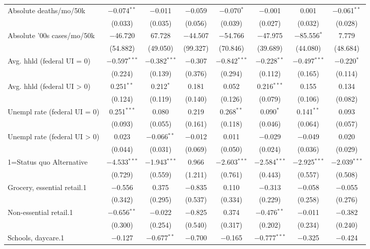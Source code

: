 \begin{table}[!htbp]
\begin{tabular}{@{\extracolsep{5pt}}lccccccc}
 Absolute deaths/mo/50k & $-$0.074$^{**}$ & $-$0.011 & $-$0.059 & $-$0.070$^{*}$ & $-$0.001 & 0.001 & $-$0.061$^{**}$ \\ 
  & (0.033) & (0.035) & (0.056) & (0.039) & (0.027) & (0.032) & (0.028) \\ 
  Absolute '00s cases/mo/50k & $-$46.720 & 67.728 & $-$44.507 & $-$54.766 & $-$47.975 & $-$85.556$^{*}$ & 7.779 \\ 
  & (54.882) & (49.050) & (99.327) & (70.846) & (39.689) & (44.080) & (48.684) \\ 
  Avg. hhld  (federal UI = 0) & $-$0.597$^{***}$ & $-$0.382$^{***}$ & $-$0.307 & $-$0.842$^{***}$ & $-$0.228$^{**}$ & $-$0.497$^{***}$ & $-$0.220$^{*}$ \\ 
  & (0.224) & (0.139) & (0.376) & (0.294) & (0.112) & (0.165) & (0.114) \\ 
  Avg. hhld  (federal UI > 0) & 0.251$^{**}$ & 0.212$^{*}$ & 0.181 & 0.052 & 0.216$^{***}$ & 0.155 & 0.134 \\ 
  & (0.124) & (0.119) & (0.140) & (0.126) & (0.079) & (0.106) & (0.082) \\ 
  Unempl rate (federal UI = 0) & 0.251$^{***}$ & 0.080 & 0.219 & 0.268$^{**}$ & 0.090$^{*}$ & 0.141$^{**}$ & 0.093 \\ 
  & (0.093) & (0.055) & (0.161) & (0.118) & (0.046) & (0.064) & (0.057) \\ 
  Unempl rate (federal UI > 0) & 0.023 & $-$0.066$^{**}$ & $-$0.012 & 0.011 & $-$0.029 & $-$0.049 & 0.020 \\ 
  & (0.044) & (0.031) & (0.069) & (0.050) & (0.024) & (0.036) & (0.029) \\ 
  1=Status quo Alternative & $-$4.533$^{***}$ & $-$1.943$^{***}$ & 0.966 & $-$2.603$^{***}$ & $-$2.584$^{***}$ & $-$2.925$^{***}$ & $-$2.039$^{***}$ \\ 
  & (0.729) & (0.559) & (1.211) & (0.761) & (0.443) & (0.557) & (0.508) \\ 
  Grocery, essential retail.1 & $-$0.556 & 0.375 & $-$0.835 & 0.110 & $-$0.313 & $-$0.058 & $-$0.055 \\ 
  & (0.342) & (0.295) & (0.537) & (0.334) & (0.229) & (0.258) & (0.276) \\ 
  Non-essential retail.1 & $-$0.656$^{**}$ & $-$0.022 & $-$0.825 & 0.374 & $-$0.476$^{**}$ & $-$0.011 & $-$0.382 \\ 
  & (0.300) & (0.254) & (0.540) & (0.317) & (0.202) & (0.234) & (0.240) \\ 
  Schools, daycare.1 & $-$0.127 & $-$0.677$^{**}$ & $-$0.700 & $-$0.165 & $-$0.777$^{***}$ & $-$0.325 & $-$0.424 \\ 

\end{tabular}
\end{table}
